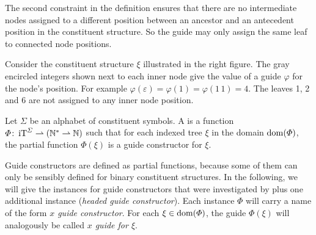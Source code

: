 \documentclass[../../document.tex]{subfiles}
\begin{document}
    The second constraint in the definition ensures that there are no intermediate nodes assigned to a different position between an ancestor and an antecedent position in the constituent structure.
    So the guide may only assign the same leaf to connected node positions.

    \bigskip\noindent
    \begin{minipage}[t]{.7\linewidth}
        \parexample*
        Consider the constituent structure \(\xi\) illustrated in the right figure.
        The gray encircled integers shown next to each inner node give the value of a guide \(\varphi\) for the node's position.
        For example \(\varphi(\varepsilon) = \varphi(1) = \varphi(1\,1) = 4\).
        The leaves 1, 2 and 6 are not assigned to any inner node position.
    \end{minipage}
    \hfill
    


    \begin{definition}
        Let \(\varSigma\) be an alphabet of constituent symbols.
        A  is a function \(\varPhi\colon \operatorname{iT}^\varSigma \rightharpoonup (\mathbb{N}^* \rightharpoonup \mathbb{N})\) such that for each indexed tree \(\xi\) in the domain \(\operatorname{dom}(\varPhi)\), the partial function \(\varPhi(\xi)\) is a guide constructor for \(\xi\).
    \end{definition}

    Guide constructors are defined as partial functions, because some of them can only be sensibly defined for binary constituent structures.
    In the following, we will give the instances for guide constructors that were investigated by \citet{Rup22} plus one additional instance (\emph{headed guide constructor}).
    Each instance \(\varPhi\) will carry a name of the form \emph{\(x\) guide constructor}.
    For each \(\xi \in \operatorname{dom}(\varPhi)\), the guide \(\varPhi(\xi)\) will analogously be called \emph{\(x\) guide for \(\xi\)}.
\end{document}
